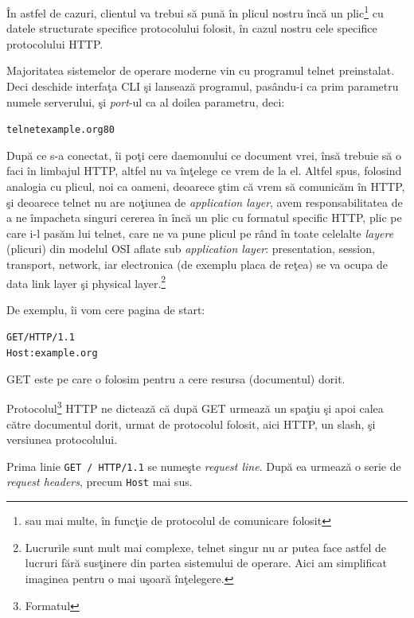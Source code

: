 În astfel de cazuri, clientul va trebui să pună în plicul nostru încă
un plic\footnote{sau mai multe, în funcţie de protocolul de comunicare folosit}
cu datele structurate specifice protocolului folosit,
în cazul nostru cele specifice protocolului HTTP.

Majoritatea sistemelor de operare moderne vin cu programul telnet preinstalat.
Deci deschide interfaţa CLI şi lansează programul, pasându-i ca prim parametru numele
serverului, şi \textit{port}-ul ca al doilea parametru, deci:
\begin{alltt}
telnet example.org 80
\end{alltt}
După ce s-a conectat, îi poţi cere daemonului ce document vrei, însă trebuie
să o faci în limbajul HTTP, altfel nu va {\glqq}înţelege{\grqq} ce vrem de la el.
Altfel spus, folosind analogia cu plicul, noi ca oameni, deoarece
ştim că vrem să comunicăm în HTTP, şi deoarece telnet nu are noţiunea
de \textit{application layer}, avem responsabilitatea de a ne
{\glqq}împacheta{\grqq} singuri cererea în încă un plic cu formatul specific HTTP,
plic pe care i-l pasăm lui telnet, care ne va pune plicul
pe rând în toate celelalte \textit{layere} ({\glqq}plicuri{\grqq}) din modelul OSI aflate
sub \textit{application layer}: presentation, session, transport, network, iar
electronica (de exemplu placa de reţea) se va ocupa de data link layer şi
physical layer.\footnote{Lucrurile sunt mult mai complexe, telnet
singur nu ar putea face astfel de lucruri fără susţinere
din partea sistemului de operare. Aici am simplificat imaginea
pentru o mai uşoară înţelegere.}

De exemplu, îi vom cere
pagina de start:
\begin{alltt}
GET / HTTP/1.1\Return
Host: example.org\Return
\Return
\end{alltt}
GET este  pe care o folosim
pentru a cere resursa (documentul) dorit.

Protocolul\footnote{Formatul} HTTP ne dictează că după GET urmează un spaţiu
şi apoi calea către documentul dorit, urmat de protocolul folosit, aici HTTP, un
slash, şi versiunea protocolului.

Prima linie \texttt{GET / HTTP/1.1} se numeşte \textsl{request line}.
După ea urmează o serie de \textsl{request headers}, precum \texttt{Host} mai sus.

